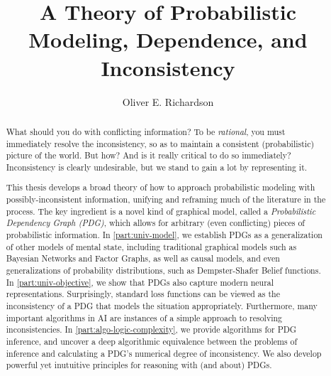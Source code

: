 \documentclass[tocprelim,
    ]{cornellmodified}
\title {%
    A Theory of Probabilistic Modeling, 
        Dependence, and Inconsistency
}
\author {Oliver E. Richardson}
\begin{document}
\maketitle
\makecopyright

\begin{abstract}
%

What should you do with conflicting information?
To be \emph{rational}, you must immediately resolve the inconsistency,
    so as to maintain a consistent (probabilistic) picture of the world.
%
But how?
And is it really critical to do so immediately?
Inconsistency is clearly undesirable, but we stand to gain a lot by representing it.
%

This thesis develops a broad theory of how to approach probabilistic modeling with possibly-inconsistent information, unifying and reframing much of the literature in the process.  
The key ingredient is a novel kind of graphical model, called a \emph{Probabilistic Dependency Graph (PDG)},
which allows for arbitrary (even conflicting) pieces of probabilistic information. 
In \cref{part:univ-model}, we establish PDGs as a generalization of other models of mental state, including traditional graphical models such as Bayesian Networks and Factor Graphs, as well as causal models, and even generalizations of probability distributions, such as Dempster-Shafer Belief functions. 
In \cref{part:univ-objective}, we show that PDGs also capture modern neural representations.
Surprisingly, standard loss functions can be viewed as the inconsistency of a PDG that models the situation appropriately. 
Furthermore, many important algorithms in AI are instances of a simple approach to resolving inconsistencies. 
In \cref{part:algo-logic-complexity}, we provide algorithms for PDG inference, and uncover a deep algorithmic equivalence between the problems of inference and calculating a PDG's numerical degree of inconsistency. 
We also develop powerful yet inutuitive principles for reasoning with (and about) PDGs. 
\end{abstract}
\end{document}
